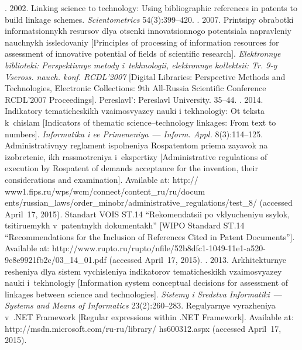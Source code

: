 \begin{multicols}{2}
{{\begin{thebibliography}{99}
.
2002. Linking science to technology: Using bibliographic references in patents to build
linkage schemes. \textit{Scientometrics} 54(3):399--420.
. 2007. Printsipy obrabotki informatsionnykh
resursov dlya otsenki in\-no\-va\-tsi\-on\-no\-go
potentsiala napravleniy nauchnykh issledovaniy
[Principles of processing of information resources for assessment of innovative potential of
fields of scientific research]. \textit{Elektronnye biblioteki: Perspektivnye metody
i~tekhnologii, elektronnye kollektsii: Tr. 9-y Vseross. nauch. konf. RCDL'2007}
[Digital Libraries: Perspective Methods and Technologies, Electronic
Collections: 9th
All-Russia Scientific Conference RCDL'2007 Proceedings]. Pereslavl':
Pereslavl University. 35--44.
. 2014.
Indikatory tematicheskikh vzaimosvyazey nauki i tekhnologiy: Ot teksta k~chislam
[Indicators of thematic science--technology linkages: From text to numbers].
\textit{Informatika i ee Primeneniya}~--- \textit{Inform. Appl.}  8(3):114--125.
Administrativnyy reglament ispolneniya Rospatentom priema zayavok na izobretenie, ikh
rassmotreniya i~eks\-per\-tizy [Administrative regulations of execution by Rospatent of
demands acceptance for the invention, their considerations and examination].
Available at: {\sf
http:// www1.fips.ru/wps/wcm/connect/content\_ru/ru/docum\linebreak
ents/russian\_laws/order\_minobr/administrative\_regulati\linebreak ons/test\_8/} (accessed April~17, 2015).
Standart VOIS ST.14 ``Rekomendatsii po vklyucheniyu ssylok, tsitiruemykh v~patentnykh
dokumentakh'' [WIPO Standard ST.14 ``Recommendations for the Inclusion of References
Cited in Patent Documents'']. Available at:
{\sf
http://www.rupto.ru/rupto/nfile/52b8dfc1-1049-11e1-a520-9c8e9921fb2c/03\_14\_01.pdf}
(accessed April~17, 2015).
. 2013.
Arkhitekturnye resheniya dlya sistem vychisleniya indikatorov tematicheskikh
vza\-imo\-svya\-zey nauki i~tekhnologiy [Information system conceptual decisions
for assessment of linkages between science and technologies]. \textit{Sistemy i Sredstva
Informatiki}~--- \textit{Systems and Means of Informatics} 23(2):260--283.
Regulyarnye vyrazheniya v~.NET Framework [Regular expressions within .NET
Framework]. Available at:
{\sf http://msdn.microsoft.com/ru-ru/library/ hs600312.aspx}
(accessed April~17, 2015).


\end{thebibliography}}}
\end{multicols}
